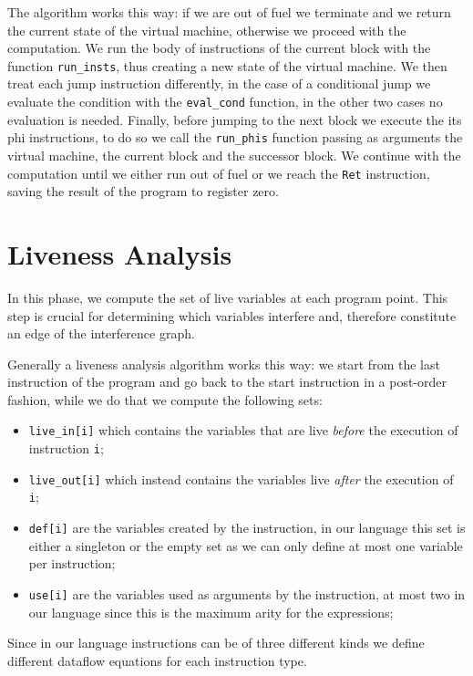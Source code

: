 The algorithm works this way: if we are out of fuel we terminate and we return the current state of the virtual machine, otherwise we proceed with the computation.
We run the body of instructions of the current block with the function \texttt{run\_insts}, thus creating a new state of the virtual machine. We then treat each jump instruction differently, in the case of a conditional jump we evaluate the condition with the \texttt{eval\_cond} function, in the other two cases no evaluation is needed. Finally, before jumping to the next block we execute the its phi instructions, to do so we call the \texttt{run\_phis} function  passing as arguments the virtual machine, the current block and the successor block.
We continue with the computation until we either run out of fuel or we reach the \texttt{Ret} instruction, saving the result of the program to register zero.

\section{Liveness Analysis}

In this phase, we compute the set of live variables at each program point. This step is crucial for determining which variables interfere and, therefore constitute an edge of the interference graph.

Generally a liveness analysis algorithm works this way:
we start from the last instruction of the program and go back to the start instruction in a post-order fashion, while we do that we compute the following sets:
\begin{itemize}
  \item \texttt{live\_in[i]} which contains the variables that are live \textit{before} the execution of instruction \texttt i;
  \item \texttt{live\_out[i]} which instead contains the variables live \textit{after} the execution of \texttt i;
  \item \texttt{def[i]} are the variables created by the instruction, in our language this set is either a singleton or the empty set as we can only define at most one variable per instruction;
  \item \texttt{use[i]} are the variables used as arguments by the instruction, at most two in our language since this is the maximum arity for the expressions;
\end{itemize}

Since in our language instructions can be of three different kinds we define different dataflow equations for each instruction type.

